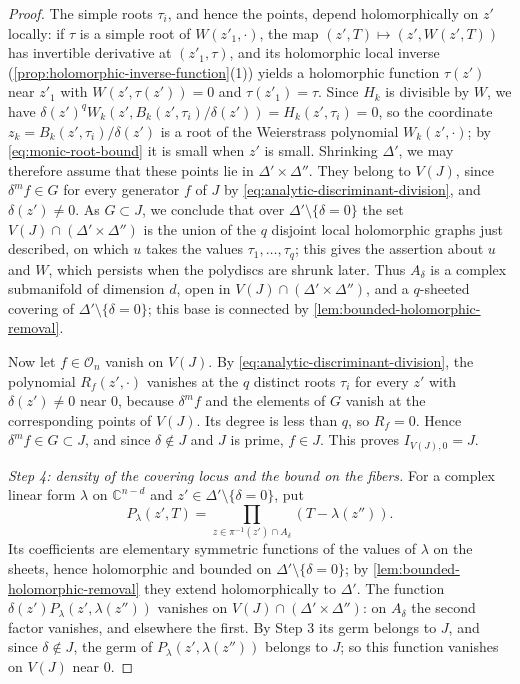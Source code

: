 \begin{proof}
The simple roots $\tau_i$, and hence the points, depend holomorphically on $z'$ locally: if $\tau$ is a simple root of $W(z'_1,\cdot)$, the map $(z',T)\mapsto(z',W(z',T))$ has invertible derivative at $(z'_1,\tau)$, and its holomorphic local inverse (\cref{prop:holomorphic-inverse-function}(1)) yields a holomorphic function $\tau(z')$ near $z'_1$ with $W(z',\tau(z'))=0$ and $\tau(z'_1)=\tau$. Since $H_k$ is divisible by $W$, we have $\delta(z')^qW_k(z',B_k(z',\tau_i)/\delta(z'))=H_k(z',\tau_i)=0$, so the coordinate $z_k=B_k(z',\tau_i)/\delta(z')$ is a root of the Weierstrass polynomial $W_k(z',\cdot)$; by \eqref{eq:monic-root-bound} it is small when $z'$ is small. Shrinking $\Delta'$, we may therefore assume that these points lie in $\Delta'\times\Delta''$. They belong to $V(J)$, since $\delta^mf\in G$ for every generator $f$ of $J$ by \eqref{eq:analytic-discriminant-division}, and $\delta(z')\neq0$. As $G\subset J$, we conclude that over $\Delta'\setminus\{\delta=0\}$ the set $V(J)\cap(\Delta'\times\Delta'')$ is the union of the $q$ disjoint local holomorphic graphs just described, on which $u$ takes the values $\tau_1,\ldots,\tau_q$; this gives the assertion about $u$ and $W$, which persists when the polydiscs are shrunk later. Thus $A_\delta$ is a complex submanifold of dimension $d$, open in $V(J)\cap(\Delta'\times\Delta'')$, and a $q$-sheeted covering of $\Delta'\setminus\{\delta=0\}$; this base is connected by \cref{lem:bounded-holomorphic-removal}.

Now let $f\in\mathcal O_n$ vanish on $V(J)$. By \eqref{eq:analytic-discriminant-division}, the polynomial $R_f(z',\cdot)$ vanishes at the $q$ distinct roots $\tau_i$ for every $z'$ with $\delta(z')\neq0$ near $0$, because $\delta^mf$ and the elements of $G$ vanish at the corresponding points of $V(J)$. Its degree is less than $q$, so $R_f=0$. Hence $\delta^mf\in G\subset J$, and since $\delta\notin J$ and $J$ is prime, $f\in J$. This proves $I_{V(J),0}=J$.

\emph{Step 4: density of the covering locus and the bound on the fibers.} For a complex linear form $\lambda$ on $\mathbb C^{n-d}$ and $z'\in\Delta'\setminus\{\delta=0\}$, put
\[
 P_\lambda(z',T)=\prod_{z\in\pi^{-1}(z')\cap A_\delta}
                     (T-\lambda(z'')).
\]
Its coefficients are elementary symmetric functions of the values of $\lambda$ on the sheets, hence holomorphic and bounded on $\Delta'\setminus\{\delta=0\}$; by \cref{lem:bounded-holomorphic-removal} they extend holomorphically to $\Delta'$. The function $\delta(z')P_\lambda(z',\lambda(z''))$ vanishes on $V(J)\cap(\Delta'\times\Delta'')$: on $A_\delta$ the second factor vanishes, and elsewhere the first. By Step 3 its germ belongs to $J$, and since $\delta\notin J$, the germ of $P_\lambda(z',\lambda(z''))$ belongs to $J$; so this function vanishes on $V(J)$ near $0$.


\end{proof}
